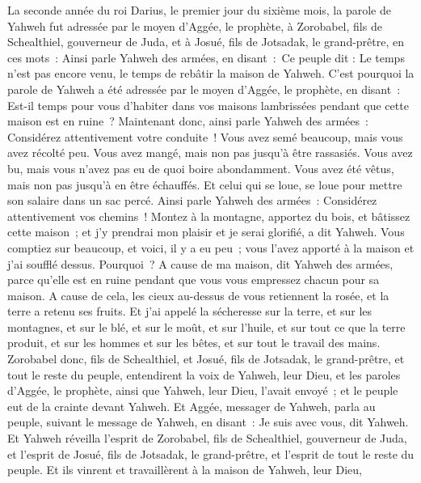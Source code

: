 \begin{multicols}{2}
\VerseOne{}La seconde année du roi Darius, le premier jour du sixième mois, la parole de Yahweh fut adressée par le moyen d'Aggée, le prophète, à Zorobabel, fils de Schealthiel, gouverneur de Juda, et à Josué, fils de Jotsadak, le grand-prêtre, en ces mots~:
Ainsi parle Yahweh des armées, en disant~:~Ce peuple dit : Le temps n'est pas encore venu, le temps de rebâtir la maison de Yahweh.
C'est pourquoi la parole de Yahweh a été adressée par le moyen d'Aggée, le prophète, en disant~:
Est-il temps pour vous d'habiter dans vos maisons lambrissées pendant que cette maison est en ruine~?
Maintenant donc, ainsi parle Yahweh des armées~: Considérez attentivement votre conduite~!
Vous avez semé beaucoup, mais vous avez récolté peu. Vous avez mangé, mais non pas jusqu'à être rassasiés. Vous avez bu, mais vous n'avez pas eu de quoi boire abondamment. Vous avez été vêtus, mais non pas jusqu'à en être échauffés. Et celui qui se loue, se loue pour mettre son salaire dans un sac percé.
Ainsi parle Yahweh des armées~: Considérez attentivement vos chemins~!
Montez à la montagne, apportez du bois, et bâtissez cette maison~; et j'y prendrai mon plaisir et je serai glorifié, a dit Yahweh.
Vous comptiez sur beaucoup, et voici, il y a eu peu~; vous l'avez apporté à la maison et j'ai soufflé dessus. Pourquoi~? A cause de ma maison, dit Yahweh des armées, parce qu'elle est en ruine pendant que vous vous empressez chacun pour sa maison.
A cause de cela, les cieux au-dessus de vous retiennent la rosée, et la terre a retenu ses fruits.
Et j'ai appelé la sécheresse sur la terre, et sur les montagnes, et sur le blé, et sur le moût, et sur l'huile, et sur tout ce que la terre produit, et sur les hommes et sur les bêtes, et sur tout le travail des mains.
Zorobabel donc, fils de Schealthiel, et Josué, fils de Jotsadak, le grand-prêtre, et tout le reste du peuple, entendirent la voix de Yahweh, leur Dieu, et les paroles d'Aggée, le prophète, ainsi que Yahweh, leur Dieu, l'avait envoyé~; et le peuple eut de la crainte devant Yahweh.
Et Aggée, messager de Yahweh, parla au peuple, suivant le message de Yahweh, en disant~: Je suis avec vous, dit Yahweh.
Et Yahweh réveilla l'esprit de Zorobabel, fils de Schealthiel, gouverneur de Juda, et l'esprit de Josué, fils de Jotsadak, le grand-prêtre, et l'esprit de tout le reste du peuple. Et ils vinrent et travaillèrent à la maison de Yahweh, leur Dieu,

\end{multicols}
